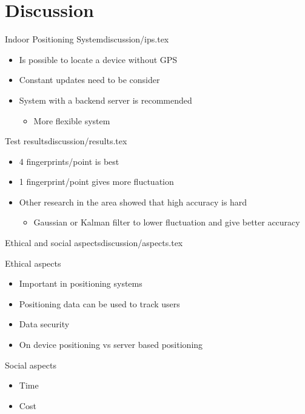 \section{Discussion}

\begin{notedFrame}{Indoor Positioning System}{discussion/ips.tex}
    \begin{itemize}
        \item Is possible to locate a device without GPS
        \item Constant updates need to be consider
        \item System with a backend server is recommended
        \begin{itemize}
            \item More flexible system
        \end{itemize}
    \end{itemize}
\end{notedFrame}

\begin{notedFrame}{Test results}{discussion/results.tex}
\begin{itemize}
    \item 4 fingerprints/point is best
    \item 1 fingerprint/point gives more fluctuation
    \item Other research in the area showed that high accuracy is hard
    \begin{itemize}
        \item Gaussian or Kalman filter to lower fluctuation and give better accuracy
    \end{itemize}
\end{itemize}
\end{notedFrame}


\begin{notedFrame}{Ethical and social aspects}{discussion/aspects.tex}
	\begin{block}{Ethical aspects}
		\begin{itemize}
		\item Important in positioning systems
		\item Positioning data can be used to track users
		\item Data security
		\item On device positioning vs server based positioning
		\end{itemize}	
	\end{block}

	\begin{block}{Social aspects}
		\begin{itemize}
			\item Time
			\item Cost
		\end{itemize}	
	\end{block}
\end{notedFrame}
